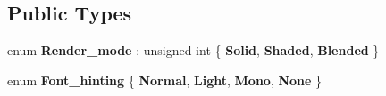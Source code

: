 \subsection*{Public Types}
\begin{DoxyCompactItemize}
\item 
\mbox{\label{classjetfuel_1_1draw_1_1Text_a1463ab136e7df19672fe6d6960c271c4}} 
enum {\bfseries Render\+\_\+mode} \+: unsigned int \{ {\bfseries Solid}, 
{\bfseries Shaded}, 
{\bfseries Blended}
 \}
\item 
\mbox{\label{classjetfuel_1_1draw_1_1Text_a8c292f81616c8749343c52f8568de77f}} 
enum {\bfseries Font\+\_\+hinting} \{ {\bfseries Normal}, 
{\bfseries Light}, 
{\bfseries Mono}, 
{\bfseries None}
 \}
\end{DoxyCompactItemize}
